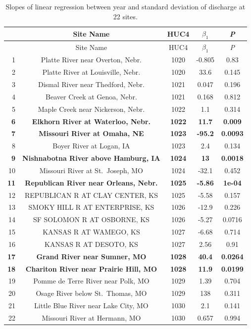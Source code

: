 \documentclass[12pt,]{article}
\begin{document}
\begin{longtable}[]{@{}rcccc@{}}
\caption{Slopes of linear regression between year and standard deviation
of discharge at 22 sites.}\tabularnewline
\toprule
~ & Site Name & HUC4 & \(\beta_1\) & \emph{P}\tabularnewline
\midrule
\endfirsthead
\toprule
~ & Site Name & HUC4 & \(\beta_1\) & \emph{P}\tabularnewline
\midrule
\endhead
1 & Platte River near Overton, Nebr. & 1020 & -0.805 &
0.83\tabularnewline
2 & Platte River at Louisville, Nebr. & 1020 & 33.6 &
0.145\tabularnewline
3 & Dismal River near Thedford, Nebr. & 1021 & 0.047 &
0.196\tabularnewline
4 & Beaver Creek at Genoa, Nebr. & 1021 & 0.168 & 0.812\tabularnewline
5 & Maple Creek near Nickerson, Nebr. & 1022 & 1.1 &
0.314\tabularnewline
\textbf{6} & \textbf{Elkhorn River at Waterloo, Nebr.} & \textbf{1022} &
\textbf{11.7} & \textbf{0.009}\tabularnewline
\textbf{7} & \textbf{Missouri River at Omaha, NE} & \textbf{1023} &
\textbf{-95.2} & \textbf{0.0093}\tabularnewline
8 & Boyer River at Logan, IA & 1023 & 2.4 & 0.134\tabularnewline
\textbf{9} & \textbf{Nishnabotna River above Hamburg, IA} &
\textbf{1024} & \textbf{13} & \textbf{0.0018}\tabularnewline
10 & Missouri River at St.~Joseph, MO & 1024 & -32.1 &
0.452\tabularnewline
\textbf{11} & \textbf{Republican River near Orleans, Nebr.} &
\textbf{1025} & \textbf{-5.86} & \textbf{1e-04}\tabularnewline
12 & REPUBLICAN R AT CLAY CENTER, KS & 1025 & -5.58 &
0.157\tabularnewline
13 & SMOKY HILL R AT ENTERPRISE, KS & 1026 & -12.9 &
0.226\tabularnewline
14 & SF SOLOMON R AT OSBORNE, KS & 1026 & -5.27 & 0.0716\tabularnewline
15 & KANSAS R AT WAMEGO, KS & 1027 & -6.68 & 0.714\tabularnewline
16 & KANSAS R AT DESOTO, KS & 1027 & 2.56 & 0.91\tabularnewline
\textbf{17} & \textbf{Grand River near Sumner, MO} & \textbf{1028} &
\textbf{40.4} & \textbf{0.0264}\tabularnewline
\textbf{18} & \textbf{Chariton River near Prairie Hill, MO} &
\textbf{1028} & \textbf{11.9} & \textbf{0.0199}\tabularnewline
19 & Pomme de Terre River near Polk, MO & 1029 & 1.39 &
0.704\tabularnewline
20 & Osage River below St.~Thomas, MO & 1029 & 138 &
0.311\tabularnewline
21 & Little Blue River near Lake City, MO & 1030 & 2.1 &
0.141\tabularnewline
22 & Missouri River at Hermann, MO & 1030 & 0.657 & 0.994\tabularnewline
\bottomrule
\end{longtable}
\end{document}
